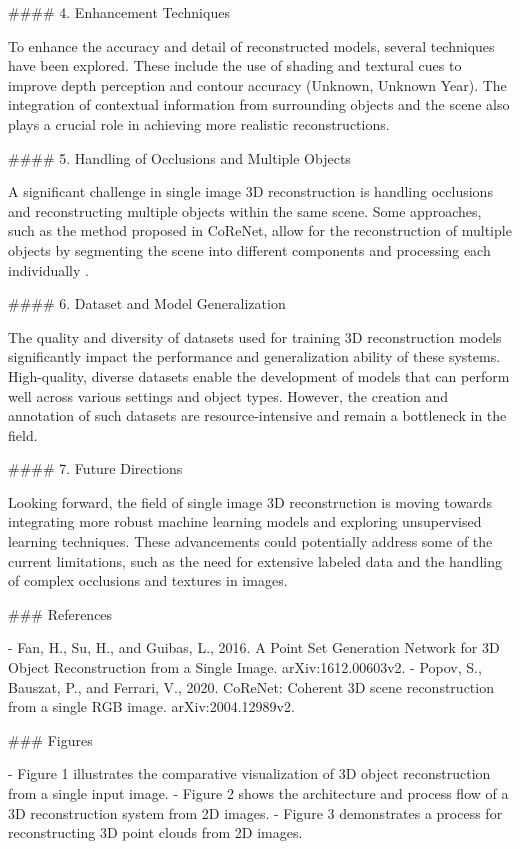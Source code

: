 \documentclass[conference]{IEEEtran}
\begin{document}
#### 4. Enhancement Techniques

To enhance the accuracy and detail of reconstructed models, several techniques have been explored. These include the use of shading and textural cues to improve depth perception and contour accuracy (Unknown, Unknown Year). The integration of contextual information from surrounding objects and the scene also plays a crucial role in achieving more realistic reconstructions.

#### 5. Handling of Occlusions and Multiple Objects

A significant challenge in single image 3D reconstruction is handling occlusions and reconstructing multiple objects within the same scene. Some approaches, such as the method proposed in CoReNet, allow for the reconstruction of multiple objects by segmenting the scene into different components and processing each individually \cite{popov2020}.

#### 6. Dataset and Model Generalization

The quality and diversity of datasets used for training 3D reconstruction models significantly impact the performance and generalization ability of these systems. High-quality, diverse datasets enable the development of models that can perform well across various settings and object types. However, the creation and annotation of such datasets are resource-intensive and remain a bottleneck in the field.

#### 7. Future Directions

Looking forward, the field of single image 3D reconstruction is moving towards integrating more robust machine learning models and exploring unsupervised learning techniques. These advancements could potentially address some of the current limitations, such as the need for extensive labeled data and the handling of complex occlusions and textures in images.

### References

- Fan, H., Su, H., and Guibas, L., 2016. A Point Set Generation Network for 3D Object Reconstruction from a Single Image. arXiv:1612.00603v2.
- Popov, S., Bauszat, P., and Ferrari, V., 2020. CoReNet: Coherent 3D scene reconstruction from a single RGB image. arXiv:2004.12989v2.

### Figures

- Figure 1 illustrates the comparative visualization of 3D object reconstruction from a single input image.
- Figure 2 shows the architecture and process flow of a 3D reconstruction system from 2D images.
- Figure 3 demonstrates a process for reconstructing 3D point clouds from 2D images.
\end{document}

